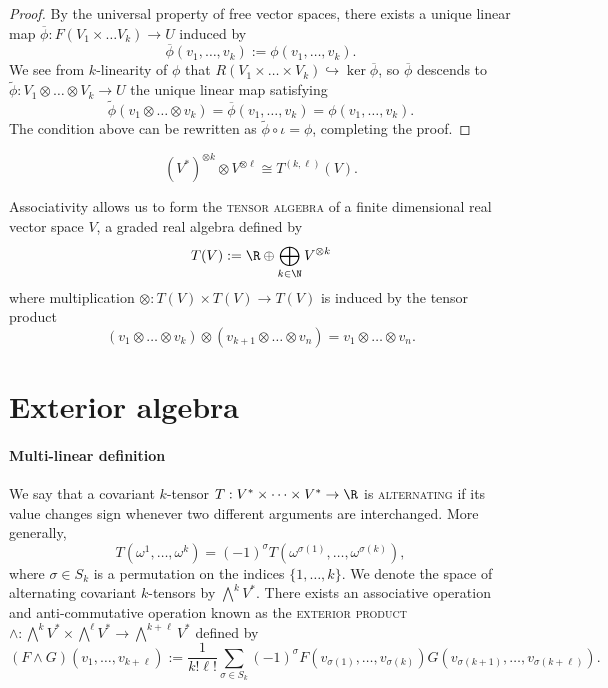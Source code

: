 \documentclass[reqno]{amsart}
\theoremstyle{definition}
\theoremstyle{remark}
\renewcommand{\emph}{\textsc}
\begin{document}
\begin{proof}
	By the universal property of free vector spaces, there exists a unique linear map $\overline \phi : F(V_1 \times \dots V_k) \to U$ induced by 
		\[ \overline \phi (v_1, \dots, v_k) := \phi(v_1, \dots, v_k).  \]
	We see from $k$-linearity of $\phi$ that $R(V_1 \times \dots \times V_k) \hookrightarrow \ker \overline \phi$, so $\overline \phi$ descends to $\widetilde \phi : V_1 \otimes \dots \otimes V_k \to U$ the unique linear map satisfying 
		\[ \widetilde \phi (v_1 \otimes \dots \otimes v_k) = \overline \phi (v_1, \dots, v_k) = \phi(v_1, \dots, v_k). \]
	The condition above can be rewritten as $\widetilde \phi \circ \iota = \phi$, completing the proof. 
\end{proof}


	\[ {(V^*)}^{\otimes k} \otimes {V}^{\otimes \ell} \cong T^{(k, \ell)} (V).  \]





	Associativity allows us to form the \emph{tensor algebra} of a finite dimensional real vector space $V$, a graded real algebra defined by 
	\[ T(V) := \R \oplus \bigoplus_{k \in \N} V^{\otimes k} \]
	where multiplication $\otimes : T(V) \times T(V) \to T(V)$ is induced by the tensor product
		\[ (v_1 \otimes \dots \otimes v_k) \otimes (v_{k + 1} \otimes \dots \otimes v_n) = v_1 \otimes \dots \otimes v_n. \]

\section{Exterior algebra}

\paragraph*{\textbf{Multi-linear definition}}

We say that a covariant $k$-tensor  $T: V^* \times \dots \times V^* \to \R$ is \emph{alternating} if its value changes sign whenever two different arguments are interchanged. More generally, 
	\[ T(\omega^1, \dots, \omega^k) = (-1)^\sigma T(\omega^{\sigma(1)}, \dots, \omega^{\sigma(k)}),\]
where $\sigma \in S_k$ is a permutation on the indices $\{1, \dots, k\}$. We denote the space of alternating covariant $k$-tensors by $\bigwedge^k V^*$. There exists an associative operation and anti-commutative operation known as the \emph{exterior product} $\wedge : \bigwedge^k V^* \times \bigwedge^\ell V^* \to \bigwedge^{k + \ell} V^*$ defined by 
	\[ (F \wedge G)(v_1, \dots, v_{k + \ell}) := \frac{1}{k! \ell!} \sum_{\sigma \in S_k} (-1)^\sigma F(v_{\sigma(1)}, \dots, v_{\sigma(k)}) G(v_{\sigma( k + 1)} ,\dots, v_{\sigma(k + \ell)}). \]
\end{document}
